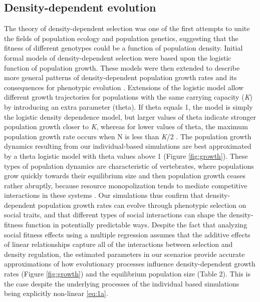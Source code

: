\documentclass{article}
\begin{document}
\subsection{Density-dependent evolution}
The theory of density-dependent selection was one of the first attempts to unite the fields of population ecology and population genetics, suggesting that the fitness of different genotypes could be a function of population density. Initial formal models of density-dependent selection \citep{Anderson1971, Charlesworth1971} were based upon the logistic function of population growth. These models were then extended to describe more general patterns of density-dependent population growth rates \citep{Gilpin1973a} and its consequences for phenotypic evolution \citep{Gilpin1976}. Extensions of the logistic model allow different growth trajectories for populations with the same carrying capacity (\textit{K}) by introducing an extra parameter (theta). If theta equals 1, the model is simply the logistic density dependence model, but larger values of theta indicate stronger population growth closer to \textit{K}, whereas for lower values of theta, the maximum population growth rate occurs when N is less than \textit{K}/2 \citep{Lande2003}. The population growth dynamics resulting from our individual-based simulations are best approximated by a theta logistic model with theta values above 1 (Figure \ref{fig:growth}). These types of population dynamics are characteristic of vertebrates, where populations grow quickly towards their equilibrium size and then population growth ceases rather abruptly, because resource monopolization tends to mediate competitive interactions in these systems \citep{Gilpin1973a}. Our simulations thus confirm that density-dependent population growth rates can evolve through phenotypic selection on social traits, and that different types of social interactions can shape the density-fitness function in potentially predictable ways. Despite the fact that analyzing social fitness effects using a multiple regression assumes that the additive effects of linear relationships capture all of the interactions between selection and density regulation, the estimated parameters in our scenarios provide accurate approximations of how evolutionary processes influence density-dependent growth rates (Figure \ref{fig:growth}) and the equilibrium population size (Table 2). This is the case despite the underlying processes of the individual based simulations being explicitly non-linear \ref{eq:1a}. 
\end{document}
